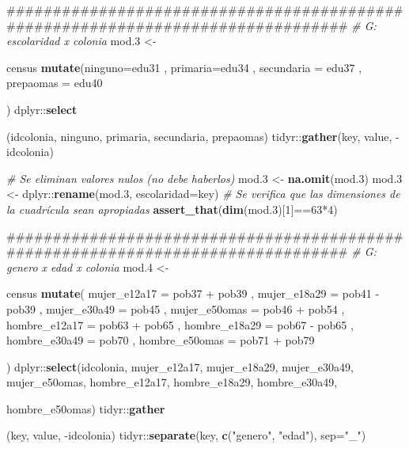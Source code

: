 \documentclass[]{article}
\newenvironment{Shaded}{\begin{snugshade}}{\end{snugshade}}
\newcommand{\KeywordTok}[1]{\textcolor[rgb]{0.13,0.29,0.53}{\textbf{{#1}}}}
\newcommand{\DataTypeTok}[1]{\textcolor[rgb]{0.13,0.29,0.53}{{#1}}}
\newcommand{\DecValTok}[1]{\textcolor[rgb]{0.00,0.00,0.81}{{#1}}}
\newcommand{\FloatTok}[1]{\textcolor[rgb]{0.00,0.00,0.81}{{#1}}}
\newcommand{\StringTok}[1]{\textcolor[rgb]{0.31,0.60,0.02}{{#1}}}
\newcommand{\CommentTok}[1]{\textcolor[rgb]{0.56,0.35,0.01}{\textit{{#1}}}}
\newcommand{\NormalTok}[1]{{#1}}
\begin{document}
\begin{Shaded}
\begin{Highlighting}[]
{{{{{{\NormalTok{################################################################################}
\CommentTok{# G: escolaridad x colonia}
\NormalTok{mod}\FloatTok{.3} \NormalTok{<-}\StringTok{ }\NormalTok{census %
\StringTok{    }\KeywordTok{mutate}\NormalTok{(}\DataTypeTok{ninguno=}\NormalTok{edu31}
           \NormalTok{, }\DataTypeTok{primaria=}\NormalTok{edu34}
           \NormalTok{, }\DataTypeTok{secundaria =} \NormalTok{edu37}
           \NormalTok{, }\DataTypeTok{prepaomas =} \NormalTok{edu40}
           \NormalTok{) %
\StringTok{    }\NormalTok{dplyr::}\KeywordTok{select}\NormalTok{(idcolonia, ninguno, primaria, secundaria, prepaomas) %
\StringTok{    }\NormalTok{tidyr::}\KeywordTok{gather}\NormalTok{(key, value, -idcolonia)}

\CommentTok{# Se eliminan valores nulos (no debe haberlos)}
\NormalTok{mod}\FloatTok{.3} \NormalTok{<-}\StringTok{ }\KeywordTok{na.omit}\NormalTok{(mod}\FloatTok{.3}\NormalTok{)}
\NormalTok{mod}\FloatTok{.3} \NormalTok{<-}\StringTok{ }\NormalTok{dplyr::}\KeywordTok{rename}\NormalTok{(mod}\FloatTok{.3}\NormalTok{, }\DataTypeTok{escolaridad=}\NormalTok{key)}
\CommentTok{# Se verifica que las dimensiones de la cuadrícula sean apropiadas}
\KeywordTok{assert_that}\NormalTok{(}\KeywordTok{dim}\NormalTok{(mod}\FloatTok{.3}\NormalTok{)[}\DecValTok{1}\NormalTok{]==}\DecValTok{63}\NormalTok{*}\DecValTok{4}\NormalTok{)}

\NormalTok{################################################################################}
\CommentTok{# G: genero x edad x colonia}
\NormalTok{mod}\FloatTok{.4} \NormalTok{<-}\StringTok{ }\NormalTok{census %
\StringTok{    }\KeywordTok{mutate}\NormalTok{(}
        \DataTypeTok{mujer_e12a17 =} \NormalTok{pob37 +}\StringTok{ }\NormalTok{pob39}
        \NormalTok{, }\DataTypeTok{mujer_e18a29 =} \NormalTok{pob41 -}\StringTok{ }\NormalTok{pob39}
        \NormalTok{, }\DataTypeTok{mujer_e30a49 =} \NormalTok{pob45}
        \NormalTok{, }\DataTypeTok{mujer_e50omas =} \NormalTok{pob46 +}\StringTok{ }\NormalTok{pob54}
        \NormalTok{, }\DataTypeTok{hombre_e12a17 =} \NormalTok{pob63 +}\StringTok{ }\NormalTok{pob65}
        \NormalTok{, }\DataTypeTok{hombre_e18a29 =} \NormalTok{pob67 -}\StringTok{ }\NormalTok{pob65}
        \NormalTok{, }\DataTypeTok{hombre_e30a49 =} \NormalTok{pob70}
        \NormalTok{, }\DataTypeTok{hombre_e50omas =} \NormalTok{pob71 +}\StringTok{ }\NormalTok{pob79}
        \NormalTok{) %
\StringTok{    }\NormalTok{dplyr::}\KeywordTok{select}\NormalTok{(idcolonia, mujer_e12a17, mujer_e18a29, mujer_e30a49, }
                  \NormalTok{mujer_e50omas, hombre_e12a17, hombre_e18a29, hombre_e30a49, }
                  \NormalTok{hombre_e50omas) %
\StringTok{    }\NormalTok{tidyr::}\KeywordTok{gather}\NormalTok{(key, value, -idcolonia) %
\StringTok{    }\NormalTok{tidyr::}\KeywordTok{separate}\NormalTok{(key, }\KeywordTok{c}\NormalTok{(}\StringTok{"genero"}\NormalTok{, }\StringTok{"edad"}\NormalTok{), }\DataTypeTok{sep=}\StringTok{"_"}\NormalTok{)}

}}}}}}}}}}}}}
\end{Highlighting}
\end{Shaded}
\end{document}
